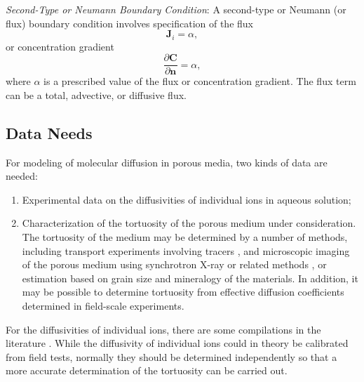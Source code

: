 \textit{Second-Type or Neumann Boundary Condition}:  
A second-type or Neumann (or flux) boundary condition involves specification of the flux
\begin{equation}   \label{eq:Neuman}
  \boldsymbol{J}_{i}=\alpha,
\end{equation}
or concentration gradient
\begin{equation}
  \frac{\partial \boldsymbol{C}}{\partial \boldsymbol{n}} = \alpha,
\end{equation}
where $\alpha$ is a prescribed value of the flux or concentration gradient. The flux term can be a total, advective, or diffusive flux.





\subsection{Data Needs}

\noindent For modeling of molecular diffusion in porous media, two kinds of data are needed:
%
\begin{enumerate}
\item  
  Experimental data on the diffusivities of individual ions in aqueous solution;
\item  
  Characterization of the tortuosity of the porous medium under consideration.  
  The tortuosity of the medium may be determined by a number of methods, 
  including transport experiments involving tracers \citep{navarre2009evolution},
  and microscopic imaging of the porous medium using synchrotron X-ray
  or related methods \citep{navarre2009evolution}, or estimation based on grain size and mineralogy of the materials.  
  In addition, it may be possible to determine tortuosity from effective diffusion coefficients determined in field-scale experiments.
\end{enumerate}

\noindent  
For the diffusivities of individual ions, there are some compilations in the literature \citep{lasaga1998kinetic,steefel2009fluid}.  
While the diffusivity of individual ions could in theory be calibrated from field tests, 
normally they should be determined independently so that a more accurate determination of the tortuosity can be carried out.







